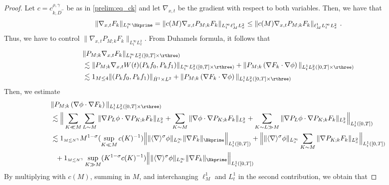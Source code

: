 \documentclass[11pt]{article}
\begin{document}
\begin{proof} 
Let \( c= c^{\rho,\gamma}_{k,D^{\prime\prime}} \) be as in \eqref{prelim:eq_ck} and let \( \nabla_{x,t} \) be the gradient with respect to both variables. Then, we have that
\begin{equation}\label{lin:eq_Fk_switch}
\| \nabla_{x,t} F_k \|_{L_t^\infty \Bkprime} = \| c(M) \nabla_{x,t} P_{M;k} F_k \|_{L_t^\infty \ell_M^1 L_x^2}\leq 
\| c(M) \nabla_{x,t} P_{M;k} F_k \|_{\ell_M^1 L_t^\infty L_x^2}~. 
\end{equation}
Thus, we have to control \( \| \nabla_{x,t} P_{M;k} F_k \|_{L_t^\infty L_x^2} \). 
From Duhamels formula, it follows that
\begin{align*}
&\| P_{M;k} \nabla_{x,t} F_k \|_{L_t^\infty L_x^2([0,T]\times \rthree)} \\
&\lesssim \| P_{M;k} \nabla_{x,t} W(t) (P_kf_0,P_k f_1) \|_{L_t^\infty L_x^2([0,T]\times \rthree)} + \| P_{M;k} \left( \nabla F_k \cdot \nabla \phi \right) \|_{L_t^1 L_x^2([0,T]\times \rthree)} \\
&\lesssim 1_{M\leq 4} \| (P_kf_0,P_k f_1) \|_{\dot{H}^1\times L^2} + \| P_{M;k} \left( \nabla F_k \cdot \nabla \phi \right) \|_{L_t^1 L_x^2([0,T]\times \rthree)} 
\end{align*}
Then, we estimate
\begin{align*}
&\| P_{M;k} \left( \nabla \phi \cdot \nabla F_k \right) \|_{L_t^1 L_x^2([0,T]\times \rthree)} \\
&\lesssim \Big \| \sum_{K\ll M} \sum_{L\sim M} \| \nabla P_L \phi \cdot \nabla P_{K;k} F_k \|_{L_x^2} + \sum_{K\sim M} \| \nabla \phi  \cdot \nabla P_{K;k} F_k \|_{L_x^2} + \sum_{K\sim L \gg M } \| \nabla P_L \phi \cdot \nabla P_{K;k} F_k \|_{L_x^2} \Big\|_{L_t^1([0,T])} \\
&\lesssim 1_{\scriptscriptstyle M \lesssim N^\gamma}  M^{1-\sigma} (\sup_{K\ll M}  c(K)^{-1}) \Big \|   \| \langle \nabla \rangle^{\sigma} \phi \|_{L_x^\infty} \| \nabla F_k \|_{\Bkprime}   \Big \|_{L_t^1([0,T])}
+ \Big \| \|\langle \nabla \rangle^{\sigma} \phi \|_{L_x^\infty} \sum_{K\sim M} \| \nabla P_{K;k} F_k \|_{L_x^2}  \Big \|_{L_t^1([0,T])}\\
&~~+ 1_{\scriptscriptstyle{ M\lesssim N^\gamma}}  \sup_{K\gg M} (K^{1-\sigma} c(K)^{-1})  \Big \| \| \langle \nabla \rangle^\sigma \phi \|_{L_x^\infty} \| \nabla F_k \|_{\Bkprime} \Big \|_{L_t^1([0,T])}
\end{align*}
By multiplying with \( c(M) \), summing in \( M \), and interchanging \( \ell_M^1 \) and \( L_t^1 \) in the second contribution, we obtain that 

\end{proof}
\end{document}
